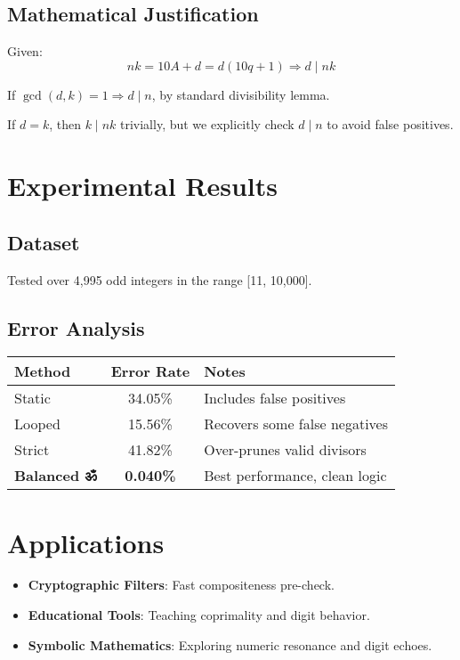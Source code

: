 \documentclass{article}
\begin{document}
\subsection{Mathematical Justification}
Given:
\[
nk = 10A + d = d(10q + 1) \Rightarrow d \mid nk
\]

If \( \gcd(d, k) = 1 \Rightarrow d \mid n \), by standard divisibility lemma.

If \( d = k \), then \( k \mid nk \) trivially, but we explicitly check \( d \mid n \) to avoid false positives.

\section{Experimental Results}

\subsection{Dataset}
Tested over 4,995 odd integers in the range [11, 10,000].

\subsection{Error Analysis}
\begin{center}
\begin{tabular}{|l|c|l|}
\hline
\textbf{Method} & \textbf{Error Rate} & \textbf{Notes} \\
\hline
Static & 34.05\% & Includes false positives \\
Looped & 15.56\% & Recovers some false negatives \\
Strict & 41.82\% & Over-prunes valid divisors \\
\textbf{Balanced ॐ} & \textbf{0.040\%} & Best performance, clean logic \\
\hline
\end{tabular}
\end{center}

\section{Applications}

\begin{itemize}
    \item \textbf{Cryptographic Filters}: Fast compositeness pre-check.
    \item \textbf{Educational Tools}: Teaching coprimality and digit behavior.
    \item \textbf{Symbolic Mathematics}: Exploring numeric resonance and digit echoes.
\end{itemize}
\end{document}
